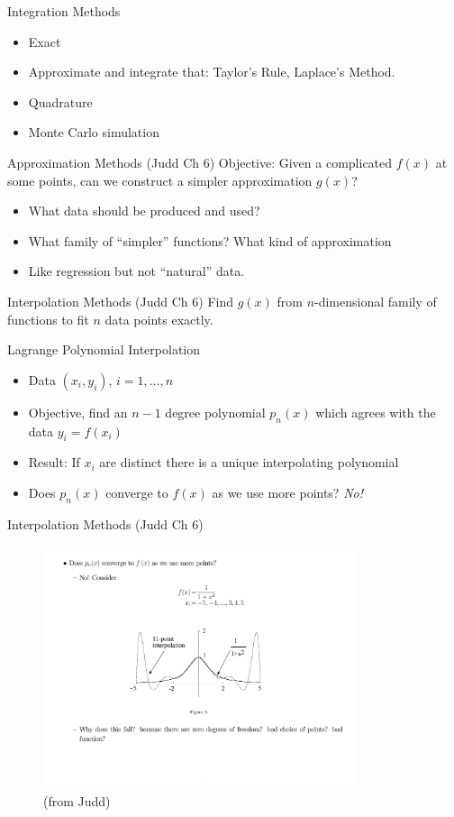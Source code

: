 \documentclass[xcolor=pdftex,dvipsnames,table,mathserif]{beamer}
\begin{document}
\begin{frame}{Integration Methods}
\begin{itemize}
\item Exact
\item Approximate and integrate that: Taylor's Rule, Laplace's Method.
\item Quadrature
\item Monte Carlo simulation
\end{itemize}
\end{frame}

\begin{frame}{Approximation Methods (Judd Ch 6)}
Objective: Given a complicated $f(x)$ at some points, can we construct a simpler approximation $g(x)$?
\begin{itemize}
\item What data should be produced and used?
\item What family of ``simpler'' functions? What kind of approximation
\item Like regression but not ``natural'' data.
\end{itemize}
\end{frame}

\begin{frame}{Interpolation Methods  (Judd Ch 6)}
Find $g(x)$ from $n$-dimensional family of functions to fit $n$ data points exactly.
\begin{block}{Lagrange Polynomial Interpolation}
\begin{itemize}
\item Data $(x_i,y_i)$, $i=1,\ldots,n$
\item Objective, find an $n-1$ degree polynomial $p_n(x)$ which agrees with the data $y_i = f(x_i)$
\item Result: If $x_i$ are distinct there is a unique interpolating polynomial
\item Does $p_n(x)$ converge to $f(x)$ as we use more points? \textit{No!}
\end{itemize}
\end{block}
\end{frame}

\begin{frame}{Interpolation Methods  (Judd Ch 6)}
\begin{figure}[htbp]
\begin{center}
\caption{(from Judd)}
\includegraphics[height=2.8in]{functionalapprox.pdf}
\end{center}
\end{figure}
\end{frame}
\end{document}
